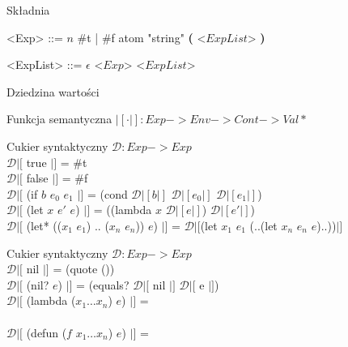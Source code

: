 \documentclass[12pt,serif]{beamer}
\begin{document}
\begin{frame}{Składnia}
\setlength{\grammarindent}{8em}
\begin{grammar}
<Exp> ::= $n$
\alt \#t | \#f
\alt atom
\alt "string"
\alt \textbf{(} <$ExpList$> \textbf{)}

<ExpList> ::= $\epsilon$
\alt <$Exp$> <$ExpList$>
\end{grammar}
\end{frame}

\begin{frame}{Dziedzina wartości}

\end{frame}

\begin{frame}{Funkcja semantyczna}
$|[ \cdot |]: Exp -> Env -> Cont -> Val*$
\end{frame}

\begin{frame}{Cukier syntaktyczny}
$\mathcal{D} : Exp -> Exp$ \newline
\\
$\mathcal{D}|[$ true $|]$ = \#t \\
$\mathcal{D}|[$ false $|]$ = \#f \newline
\\
$\mathcal{D}|[$ (if $b$ $e_0$ $e_1$ $|]$ =
   (cond $\mathcal{D}|[ b |]$ $\mathcal{D}|[ e_0 |]$ $\mathcal{D}|[ e_1 |]$) \newline
\\
$\mathcal{D}|[$ (let $x$ $e'$ $e$) $|]$ =
   ((lambda $x$ $\mathcal{D}|[e|]$) $\mathcal{D}|[e'|]$) \\
$\mathcal{D}|[$ (let* (($x_1$ $e_1$) .. ($x_n$ $e_n$)) $e$) $|]$ = 
   $\mathcal{D}|[$(let $x_1$ $e_1$ (..(let $x_n$ $e_n$ $e$)..))$|]$ \\
\end{frame}

\begin{frame}{Cukier syntaktyczny}
$\mathcal{D} : Exp -> Exp$ \newline
\\
$\mathcal{D}|[$ nil $|]$ = (quote ()) \\
$\mathcal{D}|[$ (nil? $e$) $|]$ = 
   (equals? $\mathcal{D}|[$ nil $|]$ $\mathcal{D}|[$ e $|]$) \newline
\\
$\mathcal{D}|[$ (lambda ($x_1 \ldots x_n$) $e$) $|]$ = \\
\newline
\\
$\mathcal{D}|[$ (defun ($f$ $x_1 \ldots x_n$) $e$) $|]$ = \\ 
\\

\end{frame}
\end{document}
